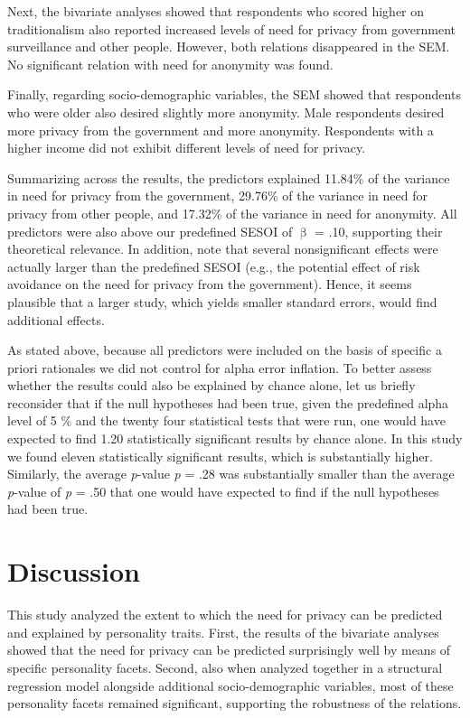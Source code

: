 \documentclass[man,floatsintext]{apa6}
\begin{document}
Next, the bivariate analyses showed that respondents who scored higher on traditionalism also reported increased levels of need for privacy from government surveillance and other people. However, both relations disappeared in the SEM. No significant relation with need for anonymity was found.

Finally, regarding socio-demographic variables, the SEM showed that respondents who were older also desired slightly more anonymity. Male respondents desired more privacy from the government and more anonymity. Respondents with a higher income did not exhibit different levels of need for privacy.

Summarizing across the results, the predictors explained 11.84\% of the variance in need for privacy from the government, 29.76\% of the variance in need for privacy from other people, and 17.32\% of the variance in need for anonymity. All predictors were also above our predefined SESOI of \textbar{}\(\upbeta\)\textbar{} = .10, supporting their theoretical relevance. In addition, note that several nonsignificant effects were actually larger than the predefined SESOI (e.g., the potential effect of risk avoidance on the need for privacy from the government). Hence, it seems plausible that a larger study, which yields smaller standard errors, would find additional effects.

As stated above, because all predictors were included on the basis of specific a priori rationales we did not control for alpha error inflation. To better assess whether the results could also be explained by chance alone, let us briefly reconsider that if the null hypotheses had been true, given the predefined alpha level of 5 \% and the twenty four statistical tests that were run, one would have expected to find 1.20 statistically significant results by chance alone. In this study we found eleven statistically significant results, which is substantially higher. Similarly, the average \emph{p}-value \emph{p} = .28 was substantially smaller than the average \emph{p}-value of \emph{p} = .50 that one would have expected to find if the null hypotheses had been true.

\hypertarget{discussion}{%
\section{Discussion}\label{discussion}}

This study analyzed the extent to which the need for privacy can be predicted and explained by personality traits. First, the results of the bivariate analyses showed that the need for privacy can be predicted surprisingly well by means of specific personality facets. Second, also when analyzed together in a structural regression model alongside additional socio-demographic variables, most of these personality facets remained significant, supporting the robustness of the relations.
\end{document}
